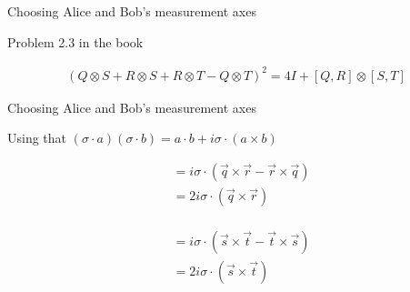 \documentclass[aspectratio=1610]{beamer}					%
\begin{document}
\begin{frame}{Choosing Alice and Bob's measurement axes}

Problem 2.3 in the book

\begin{align*}
(Q\otimes S + R\otimes S  + R\otimes T  - Q\otimes T)^{2} = 4I + [Q,R]\otimes [S,T]
\end{align*}



\end{frame}

\begin{frame}{Choosing Alice and Bob's measurement axes}

Using that $(\sigma\cdot a)(\sigma\cdot b) = a\cdot b + i\sigma\cdot(a\times b)$

\begin{align*}
[Q,R] &= i\sigma\cdot(\vec{q}\times\vec{r} - \vec{r}\times\vec{q})\\
&= 2i\sigma\cdot(\vec{q}\times\vec{r})\\
\end{align*}

\begin{align*}
[S,T] &= i\sigma\cdot(\vec{s}\times\vec{t} - \vec{t}\times\vec{s})\\
&= 2i\sigma\cdot(\vec{s}\times\vec{t})\\
\end{align*}

\end{frame}
\end{document}

